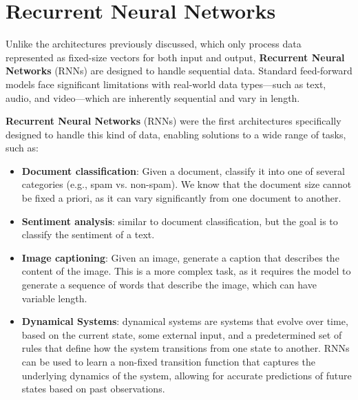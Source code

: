 \section{Recurrent Neural Networks}
Unlike the architectures previously discussed, which only process data represented as fixed-size vectors for both input and output, 
\textbf{Recurrent Neural Networks} (RNNs) are designed to handle sequential data. 
Standard feed-forward models face significant limitations with real-world data types—such as text, audio, and video—which are inherently sequential 
and vary in length.

\textbf{Recurrent Neural Networks} (RNNs) were the first architectures specifically designed to handle
this kind of data, enabling solutions to a wide range of tasks, such as:
\begin{itemize}
    \item \textbf{Document classification}: Given a document, classify it into one of several categories (e.g., spam vs. non-spam).
    We know that the document size cannot be fixed a priori, as it can vary significantly from one document to another.
    \item \textbf{Sentiment analysis}: similar to document classification, but the goal is to classify the sentiment of a text.
    \item \textbf{Image captioning}: Given an image, generate a caption that describes the content of the image.
    This is a more complex task, as it requires the model to generate a sequence of words that describe the image, which can have variable length.
    \item \textbf{Dynamical Systems}: dynamical systems are systems that evolve over time, based on the current state, some external input,
    and a predetermined set of rules that define how the system transitions from one state to another.
    RNNs can be used to learn a non-fixed transition function that captures the underlying dynamics of the system, allowing for accurate predictions of future states based on past observations.
\end{itemize}

